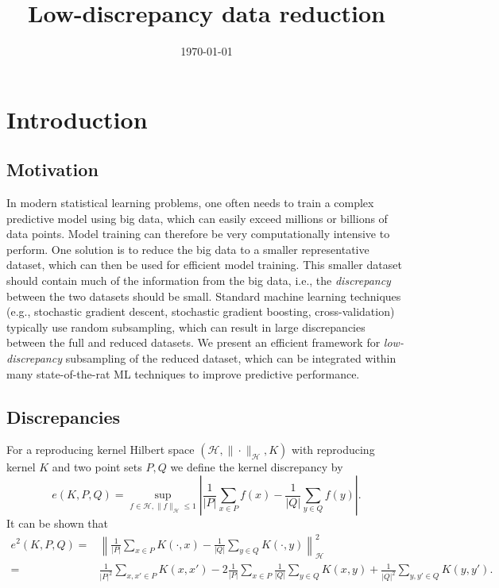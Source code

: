 \documentclass[12pt]{article}
\begin{document}
\title{Low-discrepancy data reduction}

\date{\today}

\maketitle


\section{Introduction}


\subsection{Motivation}
In modern statistical learning problems, one often needs to train a complex predictive model using big data, which can easily exceed millions or billions of data points. Model training can therefore be very computationally intensive to perform. One solution is to reduce the big data to a smaller representative dataset, which can then be used for efficient model training. This smaller dataset should contain much of the information from the big data, i.e., the \textit{discrepancy} between the two datasets should be small. Standard machine learning techniques (e.g., stochastic gradient descent, stochastic gradient boosting, cross-validation) typically use random subsampling, which can result in large discrepancies between the full and reduced datasets. We present an efficient framework for \textit{low-discrepancy} subsampling of the reduced dataset, which can be integrated within many state-of-the-rat ML techniques to improve predictive performance.

\subsection{Discrepancies}

For a reproducing kernel Hilbert space $(\mathcal{H}, \|\cdot\|_{\mathcal{H}}, K)$ with reproducing kernel $K$ and two point sets $P, Q$ we define the kernel discrepancy by
\begin{equation*}
e(K,P, Q) = \sup_{f \in \mathcal{H}, \|f\|_{\mathcal{H}} \le 1} \left|\frac{1}{|P|} \sum_{x \in P} f(x) - \frac{1}{|Q|} \sum_{y \in Q} f(y) \right|.
\end{equation*}
It can be shown that
\begin{align}\label{eRK}
e^2(K,P,Q) = & \left\| \frac{1}{|P|} \sum_{x \in P} K(\cdot, x) - \frac{1}{|Q|} \sum_{y \in Q} K(\cdot, y) \right\|_{\mathcal{H}}^2 \\ = & \frac{1}{|P|^2} \sum_{x, x' \in P} K(x, x') - 2\frac{1}{|P|} \sum_{x \in P} \frac{1}{|Q|} \sum_{y \in Q} K(x,y) + \frac{1}{|Q|^2} \sum_{y,y'\in Q} K(y, y').
\end{align}
\end{document}
